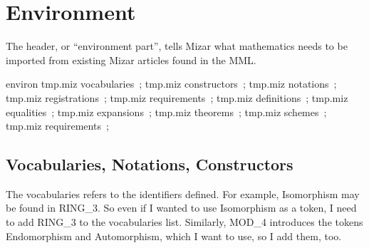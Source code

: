 \section{Environment}%

\M
The header, or ``environment part'', tells Mizar what mathematics needs
to be imported from existing Mizar articles found in the MML.

\nwenddocs{}\endmoddef\nwstartdeflinemarkup\nwenddeflinemarkup
environ
 \LA{}\code{}tmp.miz\edoc{} vocabularies~{\nwtagstyle{}}\RA{};
 \LA{}\code{}tmp.miz\edoc{} constructors~{\nwtagstyle{}}\RA{};
 \LA{}\code{}tmp.miz\edoc{} notations~{\nwtagstyle{}}\RA{};
 \LA{}\code{}tmp.miz\edoc{} registrations~{\nwtagstyle{}}\RA{};
 \LA{}\code{}tmp.miz\edoc{} requirements~{\nwtagstyle{}}\RA{};
 \LA{}\code{}tmp.miz\edoc{} definitions~{\nwtagstyle{}}\RA{};
 \LA{}\code{}tmp.miz\edoc{} equalities~{\nwtagstyle{}}\RA{};
 \LA{}\code{}tmp.miz\edoc{} expansions~{\nwtagstyle{}}\RA{};
 \LA{}\code{}tmp.miz\edoc{} theorems~{\nwtagstyle{}}\RA{};
 \LA{}\code{}tmp.miz\edoc{} schemes~{\nwtagstyle{}}\RA{};
 \LA{}\code{}tmp.miz\edoc{} requirements~{\nwtagstyle{}}\RA{};

\nwendcode{}\nwdocspar

\subsection{Vocabularies, Notations, Constructors}

\label{par:characteristic:vocabularies}
The {\Tt{}vocabularies\nwendquote} refers to the identifiers defined. For example,
{\Tt{}Isomorphism\nwendquote} may be found in {\Tt{}RING{\_}3\nwendquote}. So even if I wanted to use
{\Tt{}Isomorphism\nwendquote} as a token, I need to add {\Tt{}RING{\_}3\nwendquote} to
the vocabularies list. Similarly, {\Tt{}MOD{\_}4\nwendquote} introduces the tokens
{\Tt{}Endomorphism\nwendquote} and {\Tt{}Automorphism\nwendquote}, which I want to use, so I add
them, too.

